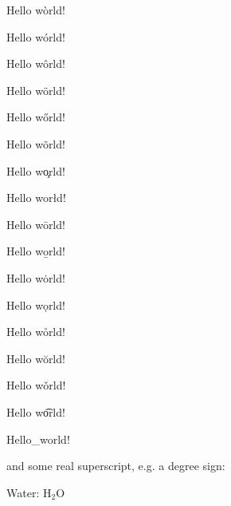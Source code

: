 \documentclass{article}
\begin{document}
Hello w\`{o}rld!

Hello w\'{o}rld!

Hello w\^orld!

Hello w\"orld!

Hello w\H{o}rld!

Hello w\~{o}rld!

Hello w\c{o}rld!


Hello wor{\l}d!

Hello w\={o}rld!

Hello w\b{o}rld!

Hello w\.{o}rld!

Hello w\d{o}rld!

Hello w\r{o}rld!

Hello w\u{o}rld!

Hello w\v{o}rld!

Hello w\t{or}ld!

Hello\_world!

and some real superscript, e.g. a degree sign:

Water: H$_2$O
\end{document}
